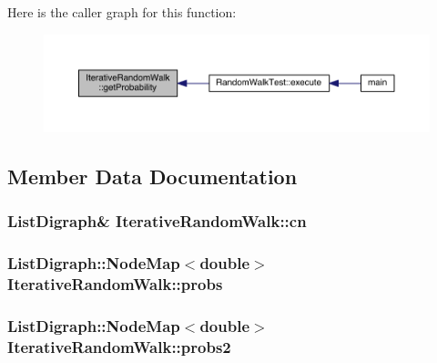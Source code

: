 Here is the caller graph for this function\+:
\nopagebreak
\begin{figure}[H]
\begin{center}
\leavevmode
\includegraphics[width=350pt]{class_iterative_random_walk_ab93a43e6a33a6e5c2d2481a96b009f78_icgraph}
\end{center}
\end{figure}




\subsection{Member Data Documentation}
\hypertarget{class_iterative_random_walk_ae71268b542c6fc06c8f06ac036f37a98}{
\subsubsection[{cn}]{\setlength{\rightskip}{0pt plus 5cm}List\+Digraph\& Iterative\+Random\+Walk\+::cn\hspace{0.3cm}{\ttfamily [private]}}}\label{class_iterative_random_walk_ae71268b542c6fc06c8f06ac036f37a98}
\hypertarget{class_iterative_random_walk_a74a536e7874d7ee633f02a690db02b46}{
\subsubsection[{probs}]{\setlength{\rightskip}{0pt plus 5cm}List\+Digraph\+::\+Node\+Map$<$double$>$ Iterative\+Random\+Walk\+::probs\hspace{0.3cm}{\ttfamily [private]}}}\label{class_iterative_random_walk_a74a536e7874d7ee633f02a690db02b46}
\hypertarget{class_iterative_random_walk_abf23a7d229dba3c619f3e05527ca2a7f}{
\subsubsection[{probs2}]{\setlength{\rightskip}{0pt plus 5cm}List\+Digraph\+::\+Node\+Map$<$double$>$ Iterative\+Random\+Walk\+::probs2\hspace{0.3cm}{\ttfamily [private]}}}\label{class_iterative_random_walk_abf23a7d229dba3c619f3e05527ca2a7f}
